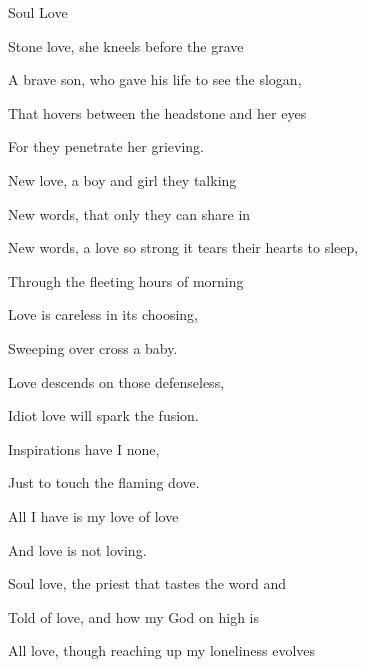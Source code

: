 \begin{song}{Soul Love}{
	
	\chordset[Verse]{ \GMaj \Em \CMaj \Bm \Am \DMaj }

	\chordset[Chorus]{ \FMaj \GSeven \Cm \GMajShE \DMajShA }
	
}

\begin{songverse}
Stone love, she kneels before the grave

A brave son, who gave his life to see the slogan,

That hovers between the headstone and her eyes\quad{}

For they penetrate her grieving.

\end{songverse}
\begin{songverse}

New love, a boy and girl they talking

New words, that only they can share in

New words, a love so strong it tears their hearts to sleep,

Through the fleeting hours of morning

\end{songverse}
\begin{songchorus}

Love is careless in its choosing,

Sweeping over cross a baby.

Love descends on those defenseless,

Idiot love will spark the fusion.


Inspirations have I none,

Just to touch the flaming dove.

All I have is my love of love

And love is not loving.

\end{songchorus}

\begin{songverse}


Soul love, the priest that tastes the word and

Told of love, and how my God on high is

All love, though reaching up my loneliness evolves\quad{}


\end{songverse}
\end{song}
